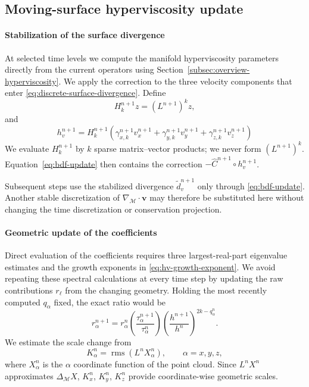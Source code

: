 \documentclass[a4paper,fleqn]{cas-sc}
\begin{document}
\subsection{Moving-surface hyperviscosity update}
\label{subsec:hyperviscosity-and-update}

\paragraph{Stabilization of the surface divergence}
At selected time levels we compute the manifold hyperviscosity parameters
directly from the current operators using
Section~\ref{subsec:overview-hyperviscosity}.  We apply the correction to the
three velocity components that enter
\eqref{eq:discrete-surface-divergence}.  Define
\begin{equation}
  H_k^{n+1}z=(L^{n+1})^kz,
  \label{eq:moving-poly-laplacian}
\end{equation}
and
\begin{equation}
  h_v^{n+1}
  =
  H_k^{n+1}\left(\gamma_{x,k}^{n+1}v_x^{n+1}+\gamma_{y,k}^{n+1}v_y^{n+1}+\gamma_{z,k}^{n+1}v_z^{n+1}\right)
  \label{eq:hyperviscosity-term}
\end{equation}
We evaluate $H_k^{n+1}$ by $k$ sparse matrix--vector products; we never form
$(L^{n+1})^k$.  Equation~\eqref{eq:bdf-update} then contains the correction
$-\widehat C^{n+1}\circ h_v^{n+1}$.

Subsequent steps use the stabilized divergence
$\widetilde d_v^{n+1}$ only through \eqref{eq:bdf-update}.  Another stable
discretization of $\nabla_{\mathcal M}\!\cdot\bm v$ may therefore be
substituted here without changing the time discretization or conservation
projection.

\paragraph{Geometric update of the coefficients}
Direct evaluation of the coefficients requires three largest-real-part
eigenvalue estimates and the growth exponents in
\eqref{eq:hv-growth-exponent}.  We avoid repeating these spectral calculations
at every time step by updating the raw contributions $r_\ell$ from the
changing geometry.  Holding the most recently computed
$q_\alpha$ fixed, the exact ratio would be
\begin{equation}
  r_\alpha^{n+1}
  =
  r_\alpha^n
  \left(\frac{\tau_\alpha^{n+1}}{\tau_\alpha^n}\right)
  \left(\frac{h^{n+1}}{h^n}\right)^{2k-q_\alpha^n}.
  \label{eq:raw-ratio-exact}
\end{equation}
We estimate the scale change from
\begin{equation}
  K_\alpha^n
  =
  \operatorname{rms}\!\left(L^nX_\alpha^n\right),
  \qquad \alpha=x,y,z,
  \label{eq:coordinate-curvature-proxy}
\end{equation}
where $X_\alpha^n$ is the $\alpha$ coordinate function of the point cloud.
Since $L^nX^n$ approximates $\Delta_{\mathcal M}X$, $K_x^n$, $K_y^n$, $K_z^n$ provide coordinate-wise geometric scales.
\end{document}
